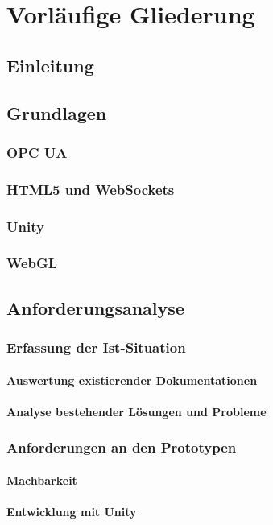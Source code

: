 \chapter{Vorläufige Gliederung}

\section{Einleitung}
\section{Grundlagen}
\subsection{OPC UA}
\subsection{HTML5 und WebSockets}
\subsection{Unity}
\subsection{WebGL}
\section{Anforderungsanalyse}
\subsection{Erfassung der Ist-Situation}
\subsubsection{Auswertung existierender Dokumentationen}
\subsubsection{Analyse bestehender Lösungen und Probleme}
\subsection{Anforderungen an den Prototypen}
\subsubsection{Machbarkeit}
\subsubsection{Entwicklung mit Unity}
